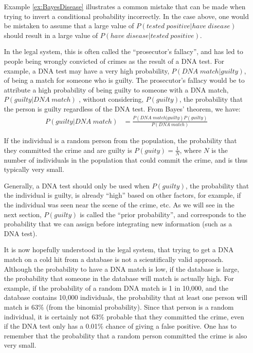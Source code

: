 Example \ref{ex:BayesDisease} illustrates a common mistake that can be made when trying to invert a conditional probability incorrectly. In the case above, one would be mistaken to assume that a large value of $P(tested\; positive | have\; disease)$ should result in a large value of $P(have\; disease|tested\; positive)$.

In the legal system, this is often called the ``prosecutor's fallacy'', and has led to people being wrongly convicted of crimes as the result of a DNA test. For example, a DNA test may have a very high probability, $P(DNA\;match|guilty)$, of being a match for someone who is guilty. The prosecutor's fallacy would be to attribute a high probability of being guilty to someone with a DNA match, $P(guilty|DNA\;match)$ , without considering, $P(guilty)$, the probability that the person is guilty regardless of the DNA test. From Bayes' theorem, we have:
\begin{align*}
P(guilty|DNA\;match) &= \frac{P(DNA\;match | guilty)P(guilty)}{P(DNA\;match)}
\end{align*}

If the individual is a random person from the population, the probability that they committed the crime and are guilty is $P(guity)=\frac{1}{N}$, where $N$ is the number of individuals in the population that could commit the crime, and is thus typically very small.

Generally, a DNA test should only be used when $P(guilty)$, the probability that the individual is guilty, is already ``high'' based on other factors, for example, if the individual was seen near the scene of the crime, etc. As we will see in the next section, $P(guilty)$ is called the ``prior probability'', and corresponds to the probability that we can assign before integrating new information (such as a DNA test).

It is now hopefully understood in the legal system, that trying to get a DNA match on a cold hit from a database is not a scientifically valid approach. Although the probability to have a DNA match is low, if the database is large, the probability that someone in the database will match is actually high. For example, if the probability of a random DNA match is 1 in 10,000, and the database contains 10,000 individuals, the probability that at least one person will match is 63\% (from the binomial probability). Since that person is a random individual, it is certainly not 63\% probable that they committed the crime, even if the DNA test only has a 0.01\% chance of giving a false positive. One has to remember that the probability that a random person committed the crime is also very small. 

